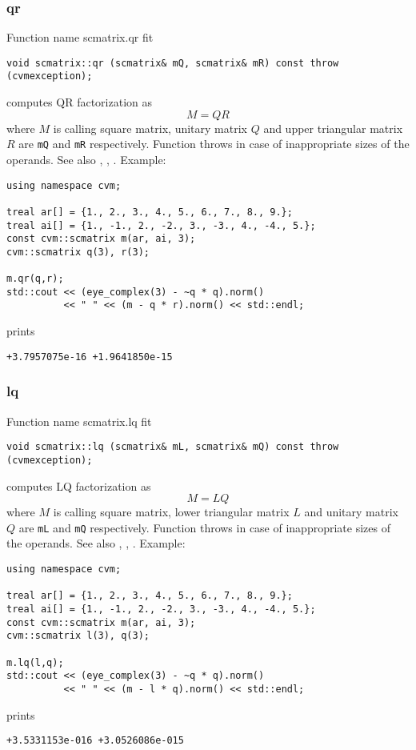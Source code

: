 \subsubsection{qr}
Function%
\pdfdest name {scmatrix.qr} fit
\begin{verbatim}
void scmatrix::qr (scmatrix& mQ, scmatrix& mR) const throw (cvmexception);
\end{verbatim}
computes QR factorization as
\begin{equation*}
M=QR
\end{equation*}
where 
$M$ is  calling square matrix, unitary matrix $Q$ 
and upper triangular matrix $R$ are \verb"mQ" and \verb"mR"
respectively. 
Function throws
in case of inappropriate sizes of the operands.
See also , ,
.
Example:
\begin{Verbatim}
using namespace cvm;

treal ar[] = {1., 2., 3., 4., 5., 6., 7., 8., 9.};
treal ai[] = {1., -1., 2., -2., 3., -3., 4., -4., 5.};
const cvm::scmatrix m(ar, ai, 3);
cvm::scmatrix q(3), r(3);

m.qr(q,r);
std::cout << (eye_complex(3) - ~q * q).norm()
          << " " << (m - q * r).norm() << std::endl;
\end{Verbatim}
prints
\begin{Verbatim}
+3.7957075e-16 +1.9641850e-15
\end{Verbatim}
\newpage



\subsubsection{lq}
Function%
\pdfdest name {scmatrix.lq} fit
\begin{verbatim}
void scmatrix::lq (scmatrix& mL, scmatrix& mQ) const throw (cvmexception);
\end{verbatim}
computes LQ factorization as
\begin{equation*}
M=LQ
\end{equation*}
where 
$M$ is  calling square matrix, lower triangular matrix $L$ 
and unitary matrix $Q$ are \verb"mL" and \verb"mQ"
respectively. 
Function throws
in case of inappropriate sizes of the operands.
See also , ,
.
Example:
\begin{Verbatim}
using namespace cvm;

treal ar[] = {1., 2., 3., 4., 5., 6., 7., 8., 9.};
treal ai[] = {1., -1., 2., -2., 3., -3., 4., -4., 5.};
const cvm::scmatrix m(ar, ai, 3);
cvm::scmatrix l(3), q(3);

m.lq(l,q);
std::cout << (eye_complex(3) - ~q * q).norm()
          << " " << (m - l * q).norm() << std::endl;
\end{Verbatim}
prints
\begin{Verbatim}
+3.5331153e-016 +3.0526086e-015
\end{Verbatim}
\newpage



